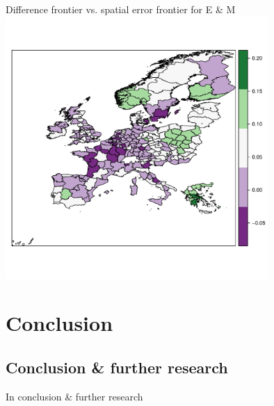 \documentclass[presentation]{beamer}
\begin{document}
\begin{frame}{Difference frontier vs. spatial error frontier for E \& M}
\includegraphics[width=0.75\textwidth]{TEfrontierdiff}
\end{frame}

\section{Conclusion}

\subsection{Conclusion \& further research}

\begin{frame}{In conclusion \& further research}

\end{frame}
\end{document}
